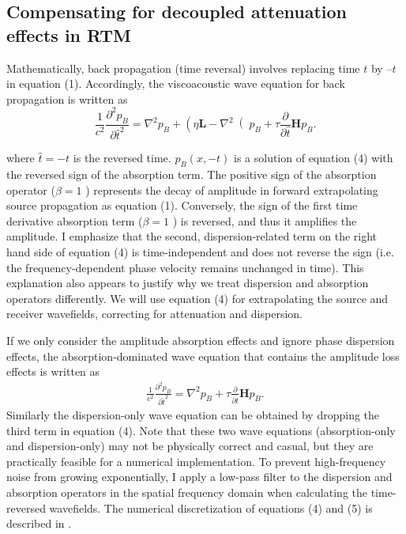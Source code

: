 \subsection{Compensating for decoupled attenuation effects in RTM}

Mathematically, back propagation (time reversal) involves replacing time $t$ by $–t$ in equation (1). Accordingly, the viscoacoustic wave equation for back propagation is written as \cite[]{zhu14b}
\begin{equation}
  \label{eq4}
 \frac{1}{c^2}\frac{\partial^2 p_{B}}{\partial \hat{t}^2} = \nabla^2 p_{B} +  \left ( \eta \mathbf{L} - \nabla^2 \right ( p_{B}+ \tau \frac{\partial}{\partial \hat{t}}\mathbf{H} p_{B}.
\end{equation}

where  $\hat{t}=-t$ is the reversed time.  $p_B(x,-t)$ is a solution of equation (4) with the reversed sign of the absorption term. The positive sign of the absorption operator ($\beta=1$ ) represents the decay of amplitude in forward extrapolating source propagation as equation (1). Conversely, the sign of the first time derivative absorption term ($\beta=1$ ) is reversed, and thus it amplifies the amplitude. I emphasize that the second, dispersion-related term on the right hand side of equation (4) is time-independent and does not reverse the sign (i.e. the frequency-dependent phase velocity remains unchanged in time). This explanation also appears to justify why we treat dispersion and absorption operators differently. We will use equation (4) for extrapolating the source and receiver wavefields, correcting for attenuation and dispersion.

If we only consider the amplitude absorption effects and ignore phase dispersion effects, the absorption-dominated wave equation that contains the amplitude loss effects is written as
\begin{eqnarray}
  \label{eq5}
 \frac{1}{c^2}\frac{\partial^2 p_{B}}{\partial \hat{t}^2} = \nabla^2 p_{B} + \tau \frac{\partial}{\partial \hat{t}}\mathbf{H} p_{B}.
\end{eqnarray}
Similarly the dispersion-only wave equation can be obtained by dropping the third term in equation (4). Note that these two wave equations (absorption-only and dispersion-only) may not be physically correct and casual, but they are practically feasible for a numerical implementation. 
To prevent high-frequency noise from growing exponentially, I apply a low-pass filter to the dispersion and absorption operators in the spatial frequency domain when calculating the time-reversed wavefields. The numerical discretization of equations (4) and (5) is described in \citet[]{zhu14a}.

